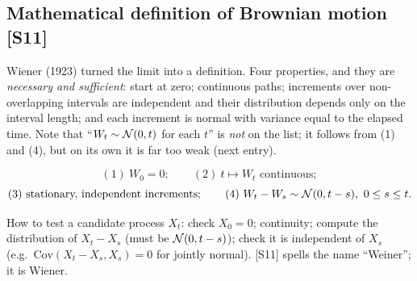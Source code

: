 \documentclass[10pt]{article}
\begin{document}
\subsection{Mathematical definition of Brownian motion [S11]}
\begin{idea}
Wiener (1923) turned the limit into a definition. Four properties, and they are \emph{necessary and sufficient}: start at zero; continuous paths; increments over non-overlapping intervals are independent and their distribution depends only on the interval length; and each increment is normal with variance equal to the elapsed time. Note that ``$W_t\sim\mathcal{N}(0,t)$ for each $t$'' is \emph{not} on the list; it follows from (1) and (4), but on its own it is far too weak (next entry).
\end{idea}
\[(1)\ W_0=0;\qquad(2)\ t\mapsto W_t\text{ continuous};\]
\[(3)\text{ stationary, independent increments};\qquad(4)\ W_t-W_s\sim\mathcal{N}(0,t-s),\ 0\le s\le t.\]
\begin{where}
\end{where}
\begin{exam}
How to test a candidate process $X_t$: check $X_0=0$; continuity; compute the distribution of $X_t-X_s$ (must be $\mathcal{N}(0,t-s)$); check it is independent of $X_s$ (e.g.\ $\mathrm{Cov}(X_t-X_s,X_s)=0$ for jointly normal). \flag{} [S11] spells the name ``Weiner''; it is Wiener.
\end{exam}
\end{document}
